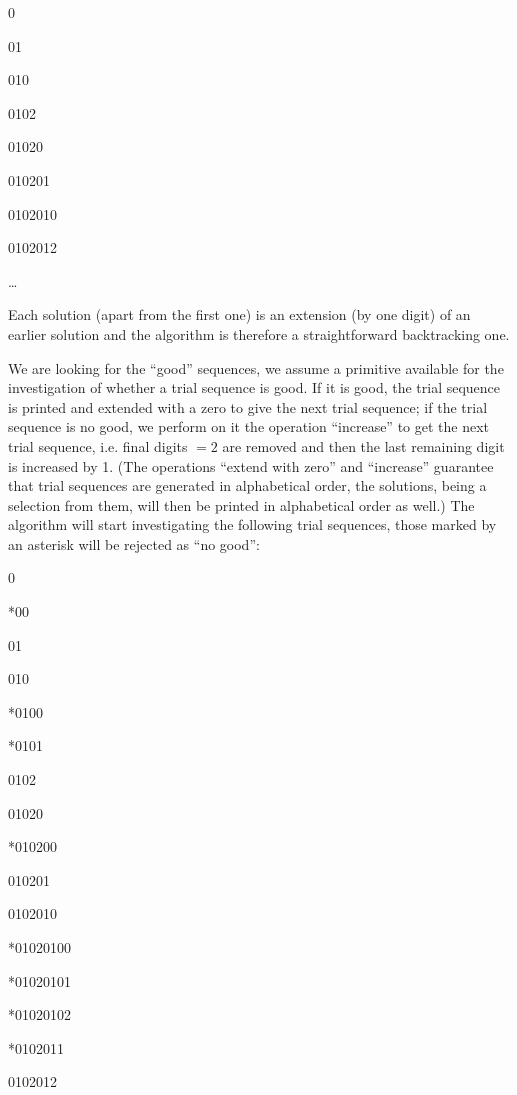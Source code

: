 \documentclass[twoside,11pt]{book}
\begin{document}
0

01

010

0102

01020

010201

0102010

0102012

\dots

Each solution (apart from the first one) is an extension (by one digit) of an earlier solution and the algorithm is therefore a straightforward backtracking one.

We are looking for the ``good'' sequences, we assume a primitive available for the investigation of whether a trial sequence is good. If it is good, the trial sequence is printed and extended with a zero to give the next trial sequence; if the trial sequence is no good, we perform on it the operation ``increase'' to get the next trial sequence, i.e. final digits $= 2$ are removed and then the last remaining digit is increased by 1. (The operations ``extend with zero'' and ``increase'' guarantee that trial sequences are generated in alphabetical order, the solutions, being a selection from them, will then be printed in alphabetical order as well.) The algorithm will start investigating the following trial sequences, those marked by an asterisk will be rejected as ``no good'':

\noindent
\tabto{\parindent}0

\noindent
*\tabto{\parindent}00

\noindent
\tabto{\parindent}01

\noindent
\tabto{\parindent}010

\noindent
*\tabto{\parindent}0100

\noindent
*\tabto{\parindent}0101

\noindent
\tabto{\parindent}0102

\noindent
\tabto{\parindent}01020

\noindent
*\tabto{\parindent}010200

\noindent
\tabto{\parindent}010201

\noindent
\tabto{\parindent}0102010

\noindent
*\tabto{\parindent}01020100

\noindent
*\tabto{\parindent}01020101

\noindent
*\tabto{\parindent}01020102

\noindent
*\tabto{\parindent}0102011

\noindent
\tabto{\parindent}0102012
\end{document}
